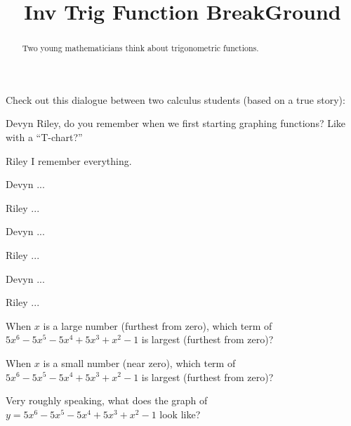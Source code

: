 \documentclass{ximera}
\title[Break-Ground:]{Inv Trig Function BreakGround}
\begin{document}
\begin{abstract}
  Two young mathematicians think about trigonometric functions.
\end{abstract}
\maketitle

Check out this dialogue between two calculus students (based on a true
story):

\begin{dialogue}
\item[Devyn] Riley, do you remember when we first starting graphing
  functions? Like with a ``T-chart?''
\item[Riley] I remember everything.
\item[Devyn] ...
\item[Riley] ...
\item[Devyn] ...
\item[Riley] ...
\item[Devyn] ...
\item[Riley] ...
\end{dialogue}

\begin{problem}
  When $x$ is a large number (furthest from zero), which term of
  $5x^6-5x^5-5x^4+5x^3+x^2 -1$ is largest (furthest from zero)?
  \begin{multipleChoice}
  \end{multipleChoice}
\end{problem}

\begin{problem}
  When $x$ is a small number (near zero), which term of
  $5x^6-5x^5-5x^4+5x^3+x^2 -1$ is largest (furthest from zero)?
  \begin{multipleChoice}
  \end{multipleChoice}
\end{problem}


\begin{problem}
  Very roughly speaking, what does the graph of
  $y=5x^6-5x^5-5x^4+5x^3+x^2 -1$ look like?
  \begin{multipleChoice}
  \end{multipleChoice}
\end{problem}




\end{document}
